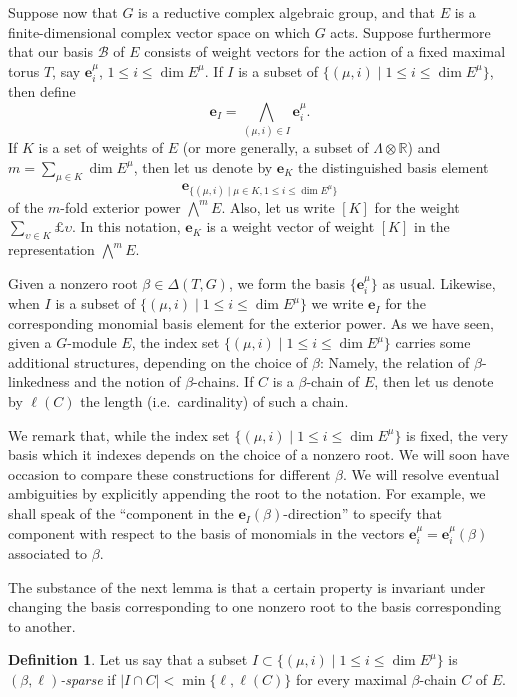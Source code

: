 \documentclass{amsart}
\theoremstyle{plain}
\theoremstyle{definition}
\newtheorem{definition}[theorem]{Definition}
\theoremstyle{remark}
\newcommand{\Vect}[1]{\mathbold{#1}}
\providecommand{\abs}[1]{\lvert#1\rvert}
\begin{document}
Suppose now that $G$ is a reductive complex algebraic group, and that $E$ is a
finite-dimensional complex vector space on which $G$ acts.
Suppose furthermore that our basis $\mathscr{B}$ of $E$ consists of weight
vectors for the action of a fixed maximal torus $T$, say $\Vect{e}^{\mu}_{i}$, $1
\leqslant i \leqslant \dim E^{\mu}$. If $I$ is a subset of
$\{(\mu, i) \mid 1 \leqslant i \leqslant \dim E^{\mu}\}$, then
define
$$\Vect{e}_{I} = \!\!\!\!\bigwedge_{(\mu, i) \in I}\!\!\!\!\Vect{e}^{\mu}_{i}.$$
If $K$ is a set of weights of $E$ (or more generally, a subset of
$\Lambda \otimes \mathbb{R}$) and $m = \sum_{\mu \in K} \dim
E^{\mu}$, then let us denote by $\Vect{e}_{K}$ the distinguished
basis element $$\Vect{e}_{\{(\mu, i) \mid \mu \in K, 1 \leqslant i
\leqslant \dim E^{\mu}\}}$$ of the $m$-fold exterior power
$\textstyle{\bigwedge^{\!m}} E$. Also, let us write $[K]$ for the
weight $\sum_{\upsilon \in K} \pounds \upsilon$. In this notation,
$\Vect{e}_{K}$ is a weight vector of weight $[K]$ in the
representation $\textstyle{\bigwedge^{\!m}} E$.



Given a nonzero root $\beta \in
\Delta(T, G)$, we form the basis $\{\Vect{e}^{\mu}_{i}\}$ as
usual. Likewise, when $I$ is a subset of $\{(\mu, i) \mid 1 \leqslant i \leqslant \dim
E^{\mu}\}$ we write $\Vect{e}_{I}$ for the corresponding monomial basis element for
the exterior power. As we
have seen, given a $G$-module $E$, the index set $\{(\mu, i) \mid 1 \leqslant i \leqslant \dim E^{\mu}\}$
carries some additional structures, depending on the choice of $\beta$: Namely, the relation of $\beta$-linkedness and the notion of $\beta$-chains.
If $C$
is a $\beta$-chain of $E$, then let us denote by $\ell(C)$ the length (i.e.\ cardinality)
of such a chain.

We remark that, while the index set $\{(\mu, i) \mid 1 \leqslant i
\leqslant \dim
E^{\mu}\}$ is fixed, the very basis which it indexes depends on the choice of a nonzero
root. We will soon have occasion to compare these constructions for different $\beta$.
We will resolve eventual ambiguities by explicitly appending the root to the notation. For
example,
we shall speak of the ``component in the $\Vect{e}_{I}(\beta)$-direction''
to specify that component with respect to the basis of monomials in the
vectors $\Vect{e}^{\mu}_{i} = \Vect{e}^{\mu}_{i}(\beta)$ associated to $\beta$.

The
substance of the next lemma is that a certain property is invariant under
changing the basis corresponding to one nonzero root to the basis corresponding to
another.
\begin{definition}
Let us say that a subset $I \subset \{(\mu, i) \mid 1 \leqslant i \leqslant \dim
E^{\mu}\}$ is \emph{$(\beta, \ell)$-sparse} if $\abs{I \cap C} < \min \{\ell, \ell(C)\}$
for every maximal $\beta$-chain $C$ of $E$.
\end{definition}
\end{document}
